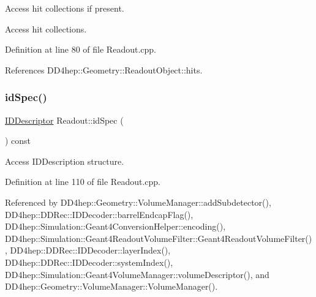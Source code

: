 Access hit collections if present. 

Access hit collections. 

Definition at line 80 of file Readout.\+cpp.



References D\+D4hep\+::\+Geometry\+::\+Readout\+Object\+::hits.

\hypertarget{class_d_d4hep_1_1_geometry_1_1_readout_a3930f675f87469d26910268c3b7066ca}{}\label{class_d_d4hep_1_1_geometry_1_1_readout_a3930f675f87469d26910268c3b7066ca} 
\subsubsection{\texorpdfstring{id\+Spec()}{idSpec()}}
{\footnotesize\ttfamily \hyperlink{class_d_d4hep_1_1_geometry_1_1_i_d_descriptor}{I\+D\+Descriptor} Readout\+::id\+Spec (\begin{DoxyParamCaption}{ }\end{DoxyParamCaption}) const}



Access I\+D\+Description structure. 



Definition at line 110 of file Readout.\+cpp.



Referenced by D\+D4hep\+::\+Geometry\+::\+Volume\+Manager\+::add\+Subdetector(), D\+D4hep\+::\+D\+D\+Rec\+::\+I\+D\+Decoder\+::barrel\+Endcap\+Flag(), D\+D4hep\+::\+Simulation\+::\+Geant4\+Conversion\+Helper\+::encoding(), D\+D4hep\+::\+Simulation\+::\+Geant4\+Readout\+Volume\+Filter\+::\+Geant4\+Readout\+Volume\+Filter(), D\+D4hep\+::\+D\+D\+Rec\+::\+I\+D\+Decoder\+::layer\+Index(), D\+D4hep\+::\+D\+D\+Rec\+::\+I\+D\+Decoder\+::system\+Index(), D\+D4hep\+::\+Simulation\+::\+Geant4\+Volume\+Manager\+::volume\+Descriptor(), and D\+D4hep\+::\+Geometry\+::\+Volume\+Manager\+::\+Volume\+Manager().

\hypertarget{class_d_d4hep_1_1_geometry_1_1_readout_a428dd087a41dd1820ef634026aa2e3a7}{}\label{class_d_d4hep_1_1_geometry_1_1_readout_a428dd087a41dd1820ef634026aa2e3a7} 
